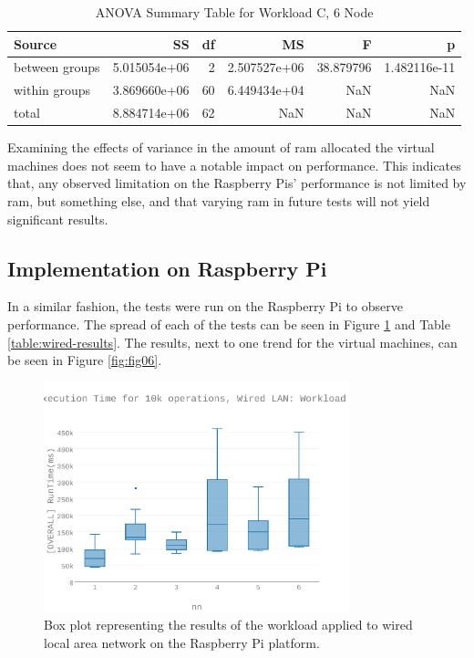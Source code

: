 \begin{table}
\begin{tabular}{lrrrrr}
\toprule
         Source &            SS &  df &            MS &          F &             p \\
\midrule
 between groups &  5.015054e+06 &   2 &  2.507527e+06 &  38.879796 &  1.482116e-11 \\
  within groups &  3.869660e+06 &  60 &  6.449434e+04 &        NaN &           NaN \\
          total &  8.884714e+06 &  62 &           NaN &        NaN &           NaN \\
\bottomrule
\end{tabular}
\caption{ANOVA Summary Table for Workload C, 6 Node}
\label{table:ram_variance_analysis_workload_c_6_node}
\end{table}

Examining the effects of variance in the amount of \gls{ram} allocated the virtual machines does not seem to have a notable impact on performance.  This indicates that, any observed limitation on the Raspberry Pis’ performance is not limited by \gls{ram}, but something else, and that varying \gls{ram} in future tests will not yield significant results.


\subsection{Implementation on Raspberry Pi}

In a similar fashion, the tests were run on the Raspberry Pi to observe performance.  The spread of each of the tests can be seen in Figure \ref{fig:wlc_fig10} and Table \ref{table:wired-results}.  The results, next to one trend for the virtual machines, can be seen in Figure \ref{fig:fig06}. 

\begin{figure}[h]
\includegraphics[width=3.5in]{Figures/figures-wlc_fig10.pdf}

\caption{Box plot representing the results of the workload applied to wired local area network on the Raspberry Pi platform.}

\label{fig:wlc_fig10}
\end{figure}

